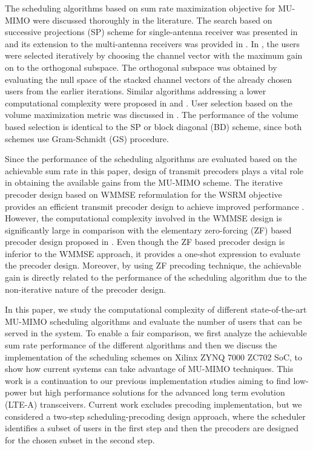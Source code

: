 \documentclass[conference,letterpaper,10pt]{./../../IEEE/IEEEtran}
\begin{document}
The scheduling algorithms based on sum rate maximization objective for \ac{MU-MIMO} were discussed thoroughly in the literature. The search based on successive projections (SP) scheme for single-antenna receiver was presented in \cite{sus2006zfbf} and its extension to the multi-antenna receivers was provided in \cite{Tolli-etal-2005}. In \cite{Tolli-etal-2005}, the users were selected iteratively by choosing the channel vector with the maximum gain on to the orthogonal subspace. The orthogonal subspace was obtained by evaluating the null space of the stacked channel vectors of the already chosen users from the earlier iterations. Similar algorithms addressing a lower computational complexity were proposed in \cite{shen2006low} and \cite{youtuan2007improved}. User selection based on the volume maximization metric was discussed in \cite{jin2010novel}. The performance of the volume based selection is identical to the SP or block diagonal (BD) scheme, since both schemes use Gram-Schmidt (GS) procedure.

Since the performance of the scheduling algorithms are evaluated based on the achievable sum rate in this paper, design of transmit precoders plays a vital role in obtaining the available gains from the \ac{MU-MIMO} scheme. The iterative precoder design based on \ac{WMMSE} reformulation for the \ac{WSRM} objective provides an efficient transmit precoder design to achieve improved performance \cite{wmmse_shi}. However, the computational complexity involved in the \ac{WMMSE} design is significantly large in comparison with the elementary zero-forcing (ZF) based precoder design proposed in \cite{spencer2004zero}. Even though the ZF based precoder design is inferior to the \ac{WMMSE} approach, it provides a one-shot expression to evaluate the precoder design. Moreover, by using ZF precoding technique, the achievable gain is directly related to the performance of the scheduling algorithm due to the non-iterative nature of the precoder design.

In this paper, we study the computational complexity of different state-of-the-art \ac{MU-MIMO} scheduling algorithms and evaluate the number of users that can be served in the system. To enable a fair comparison, we first analyze the achievable sum rate performance of the different algorithms and then we discuss the implementation of the scheduling schemes on Xilinx ZYNQ 7000 ZC702 \ac{SoC}, to show how current systems can take advantage of \ac{MU-MIMO} techniques. This work is a continuation to our previous implementation studies \cite{Janhunen-etal-11, Hanninen-etal-2014, Shahabuddin-etal-2014} aiming to find low-power but high performance solutions for the advanced long term evolution (LTE-A) transceivers. Current work excludes precoding implementation, but we considered a two-step scheduling-precoding design approach, where the scheduler identifies a subset of users in the first step and then the precoders are designed for the chosen subset in the second step.
\end{document}
